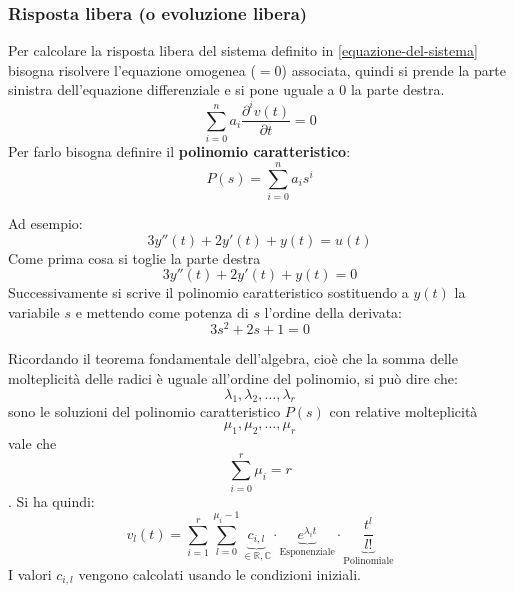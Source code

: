 \documentclass[a4paper]{article}
\begin{document}
\subsubsection{Risposta libera (o evoluzione libera)}
Per calcolare la risposta libera del sistema definito in \ref{equazione-del-sistema}
bisogna risolvere l'equazione omogenea 
($=0$) associata, quindi si prende la parte sinistra
dell'equazione differenziale e si pone uguale a 0 la parte destra.
\begin{equation}
  \sum_{i=0}^{n} a_i \frac{\partial^{i} v(t)}{\partial t} = 0
  \label{eq-risposta-libera}
\end{equation}
\[
\] 
Per farlo bisogna definire il \textbf{polinomio caratteristico}:
\[
P(s) = \sum_{i=0}^{n} a_i s^i
\] 
\begin{example}
  Ad esempio:
  \[
  3 y''(t) + 2 y'(t) + y(t) = u(t)
  \] 
  Come prima cosa si toglie la parte destra
  \[
  3 y''(t) + 2 y'(t) + y(t) = 0
  \] 
  Successivamente si scrive il polinomio caratteristico sostituendo a \( y(t) \) la
  variabile \( s \) e mettendo come potenza di \( s \)  l'ordine della derivata:
  \[
  3s^2 + 2s + 1 = 0
  \] 
\end{example}
Ricordando il teorema fondamentale dell'algebra, cioè che la somma delle molteplicità
delle radici è uguale all'ordine del polinomio, si può dire che:
\[
\lambda_1, \lambda_2, \ldots, \lambda_r
\]
sono le soluzioni del polinomio caratteristico \( P(s) \) con relative molteplicità
\[ \mu_1, \mu_2, \ldots, \mu_r \] vale che \[ \sum_{i=0}^{r} \mu_i = r \]. Si ha quindi:
\[
  v_l(t) = \sum_{i=1}^{r} \sum_{l=0}^{\mu_i - 1} 
  \underbrace{c_{i,l}}_{\in \mathbb{R}, \mathbb{C}}  \cdot 
  \underbrace{e^{\lambda_i t}}_{\text{Esponenziale}} \cdot 
  \underbrace{\frac{t^l}{l!}}_{\text{Polinomiale}}
\] 
I valori \( c_{i,l} \) vengono calcolati usando le condizioni iniziali.
\end{document}
